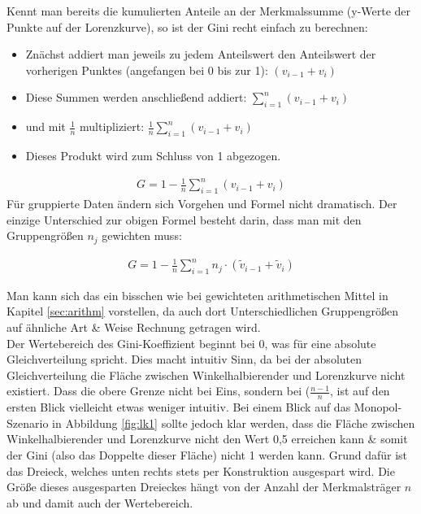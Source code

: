 \documentclass[a4paper]{article}
\begin{document}
\noindent Kennt man bereits die kumulierten Anteile an der Merkmalssumme (y-Werte der Punkte auf der Lorenzkurve), so ist der Gini recht einfach zu berechnen:
\begin{itemize}
    \item Znächst addiert man jeweils zu jedem Anteilswert den Anteilswert der vorherigen Punktes (angefangen bei 0 bis zur 1): $(v_{i-1}+v_i)$
    \item Diese Summen werden anschließend addiert: $\sum_{i=1}^n (v_{i-1}+v_i)$
    \item und mit $\frac{1}{n}$ multipliziert: $\frac{1}{n}\sum_{i=1}^n (v_{i-1}+v_i)$
    \item Dieses Produkt wird zum Schluss von 1 abgezogen.
\end{itemize}
\begin{align*}
    G=1-\frac{1}{n}\sum_{i=1}^n (v_{i-1} + v_i)
\end{align*}
Für gruppierte Daten ändern sich Vorgehen und Formel nicht dramatisch. Der einzige Unterschied zur obigen Formel besteht darin, dass man mit den Gruppengrößen $n_j$ gewichten muss:

\begin{align*}
    G=1-\frac{1}{n}\sum_{i=1}^n n_j \cdot (\tilde v_{i-1} + \tilde v_i)
\end{align*}

\noindent Man kann sich das ein bisschen wie bei gewichteten arithmetischen Mittel in Kapitel \ref{sec:arithm} vorstellen, da auch dort Unterschiedlichen Gruppengrößen auf ähnliche Art \& Weise Rechnung getragen wird.\\

\noindent Der Wertebereich des Gini-Koeffizient beginnt bei 0, was für eine absolute Gleichverteilung spricht. Dies macht intuitiv Sinn, da bei der absoluten Gleichverteilung die Fläche zwischen Winkelhalbierender und Lorenzkurve nicht existiert. Dass die obere Grenze nicht bei Eins, sondern bei ($\frac{n-1}{n}$, ist auf den ersten Blick vielleicht etwas weniger intuitiv. Bei einem Blick auf das Monopol-Szenario in Abbildung \ref{fig:lk1} sollte jedoch klar werden, dass die Fläche zwischen Winkelhalbierender und Lorenzkurve nicht den Wert 0,5 erreichen kann \& somit der Gini (also das Doppelte dieser Fläche) nicht 1 werden kann. Grund dafür ist das Dreieck, welches unten rechts stets per Konstruktion ausgespart wird. Die Größe dieses ausgesparten Dreieckes hängt von der Anzahl der Merkmalsträger $n$ ab und damit auch der Wertebereich.\\
\end{document}
